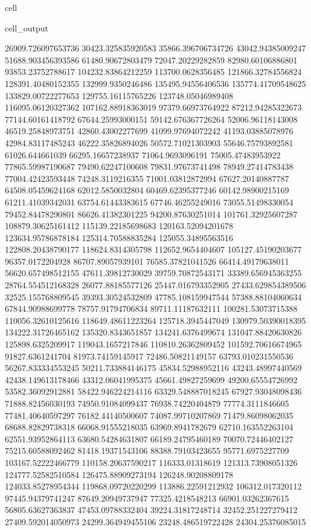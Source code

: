 \documentclass[letterpaper,10pt,english]{jupyterBook}
\begin{document}
\begin{sphinxuseclass}{cell}
\begin{sphinxVerbatimOutput}
\begin{sphinxuseclass}{cell_output}
\begin{sphinxVerbatim}[commandchars=\\\{\}]
26909.726097653736  30423.325835920583  35866.396706734726  43042.94385009247  51688.903456393586  61480.90672803479  72047.20229282859  82980.60106886801  93853.23752788617  104232.83864212259  113700.0628356485  121866.32784556824  128391.40480152355  132999.9350246486  135495.94556406536  135774.41709548625  133829.00722277653  129755.16115765226  123748.05046989408  116095.06120327362  107162.88918363019  97379.66973764922  87212.94285322673  77144.60161418792  67644.25993000151  59142.676367726264  52006.96118143008  46519.25848973751  42860.43002277699  41099.97694072242  41193.03885078976  42984.83117485243  46222.35826894026  50572.71021303903  55646.75793892581  61026.644661039  66295.16657238937  71064.9693096191  75005.47483953922  77865.59987190687  79490.62247100608  79831.97673741498  78949.27414783438  77004.42423593448  74248.3119216355  71001.03812872994  67627.20140887787  64508.05459624168  62012.5850032804  60469.62395377246  60142.98900215169  61211.41039342031  63754.61443383615  67746.46255249016  73055.51498330054  79452.84478290801  86626.41382301225  94200.87630251014  101761.32925607287  108879.30625161412  115139.22185698683  120163.52094201678  123634.95786878184  125314.70588835284  125055.34895563516  122808.20438790177  118624.8314305798  112652.9654404607  105127.45190203677  96357.0172204928  86707.89057939101  76585.37821041526  66414.49179638011  56620.657498512155  47611.39812730029  39759.70872543171  33389.656945363255  28764.554512168328  26077.88185577126  25447.016793352905  
27433.629854389506  32525.155768809545  39393.30524532809  47785.108159947544  57388.88104060634  67844.90988699778  78757.91794706834  89711.11187632111  100281.53073715388  110056.32610125616  118649.48611223264  125718.3945447049  130979.50390018395  134222.31726465162  135320.8343651857  134241.6376499674  131047.88420630826  125898.6325209917  119043.1657217846  110810.26362809452  101592.70616674965  91827.6361241704  81973.74159145917  72486.50821149157  63793.010231550536  56267.833334553245  50211.733884146175  45834.52988952116  43243.48997440569  42438.149613178466  43312.06041995375  45661.49827259699  49200.65554726992  53582.36092912881  58422.946224214116  63329.548887018245  67927.93048098436  71888.82456030193  74950.91084099437  76938.74220404879  77774.3111846605  77481.40640597297  76182.44140500607  74087.99710207869  71479.86098062035  68688.82829738318  66068.91555218035  63969.8941782679  62710.163552263104  62551.93952864113  63680.54284631807  66189.24795460189  70070.72446402127  75215.60588092462  81418.19371543106  88388.79103423655  95771.6975227709  103167.52222466779  110158.20637590217  116333.01318619  121313.73908051326  124777.52582510584  126475.88909273194  126248.90208809178  124033.85278954344  119868.09720220299  113886.22591212932  106312.017320112  97445.94379741247  87649.20949737947  77325.4218548213  66901.03262367615  56805.63627363837  47453.09788332404  39224.31817248714  32452.251227279412  27409.592014050973  24299.364949455106  23248.486519722428  24304.25376085015  

\end{sphinxVerbatim}
\end{sphinxuseclass}
\end{sphinxVerbatimOutput}
\end{sphinxuseclass}
\end{document}
